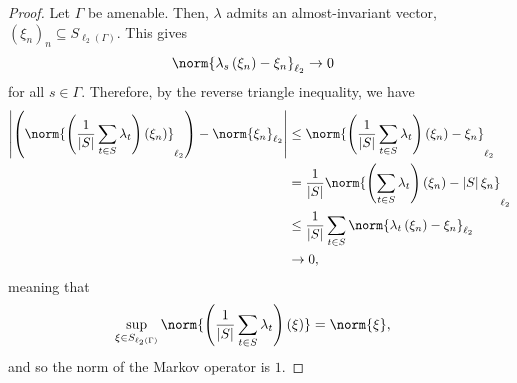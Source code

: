 \begin{proof}
  Let $\Gamma$ be amenable. Then, $\lambda$ admits an almost-invariant vector, $\left( \xi_n \right)_n\subseteq S_{\ell_2\left( \Gamma \right)}$. This gives
  \begin{align*}
    \norm{\lambda_s\left( \xi_n \right) - \xi_n}_{\ell_2} &\rightarrow 0
  \end{align*}
  for all $s\in \Gamma$. Therefore, by the reverse triangle inequality, we have
  \begin{align*}
    \left\vert \left(\norm{\left(\frac{1}{\left\vert S \right\vert}\sum_{t\in S}\lambda_t\right)\left(\xi_n\right)}_{\ell_2}\right)  - \norm{\xi_n}_{\ell_2}\right\vert &\leq \norm{\left(\frac{1}{\left\vert S \right\vert}\sum_{t\in S}\lambda_t\right)\left(\xi_n\right) - \xi_n}_{\ell_2}\\
                                                                                                                                                                                  &= \frac{1}{\left\vert S \right\vert}\norm{\left(\sum_{t\in S}\lambda_t\right)\left(\xi_n\right) - \left\vert S \right\vert\xi_n}_{\ell_2}\\
                                                                                                                        &\leq \frac{1}{\left\vert S \right\vert} \sum_{t\in S}\norm{\lambda_t\left(\xi_n\right) - \xi_n}_{\ell_2}\\
                                                                                                                        &\rightarrow 0,
  \end{align*}
  meaning that
  \begin{align*}
    \sup_{\xi\in S_{\ell_2\left(\Gamma\right)}} \norm{\left(\frac{1}{\left\vert S \right\vert}\sum_{t\in S}\lambda_t\right)\left(\xi\right)} &= \norm{\xi},
  \end{align*}
  and so the norm of the Markov operator is $1$.\newline


\end{proof}
